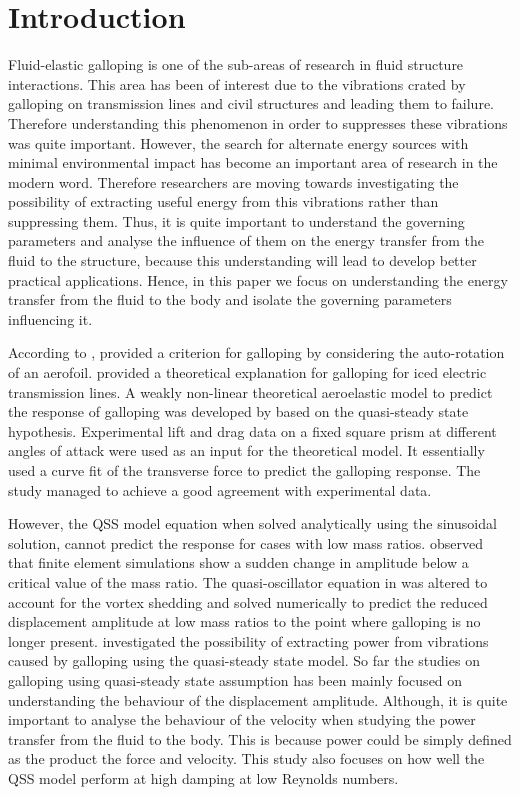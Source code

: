 \section{Introduction} 
 
Fluid-elastic galloping is one of the sub-areas of research in fluid structure interactions. This area has been of interest due to the vibrations crated by galloping on transmission lines and civil structures and leading them to failure. Therefore understanding this phenomenon in order to suppresses these vibrations was quite important. However, the search for alternate energy sources with minimal environmental impact has become an important area of research in the modern word. Therefore researchers are moving towards investigating the possibility of extracting useful energy from this vibrations rather than suppressing them. Thus, it is quite important to understand the governing parameters and analyse the influence of them on the energy transfer from the fluid to the structure, because this understanding will lead to develop better practical applications. Hence, in this paper we focus on understanding the energy transfer from the fluid to the body and isolate the governing parameters influencing it.

According to \citet{Paidoussis2010}, \citet{Glauert1919} provided a criterion for galloping by considering the auto-rotation of an aerofoil.  \citet{DenHartog1956} provided a theoretical explanation for galloping for iced electric transmission lines. A weakly non-linear theoretical aeroelastic model to predict the response of galloping was developed by \citet{Parkinson1964} based on the quasi-steady state hypothesis. Experimental lift and drag data on a fixed square prism at different angles of attack were used as an input for the theoretical model. It essentially used a curve fit of the transverse force to predict the galloping response. The study managed to achieve a good agreement with experimental data.

However, the QSS model equation when solved analytically using the sinusoidal solution, cannot predict the response for cases with low mass ratios. \citet{Joly2012} observed that finite element simulations show a sudden change in amplitude below a critical value of the mass ratio. The quasi-oscillator equation in \citet{Parkinson1964} was altered to account for the vortex shedding and solved numerically to predict the reduced displacement amplitude at low mass ratios to the point where galloping is no longer present. \citet{Barrero-Gil2010a} investigated the possibility of extracting power from vibrations caused by galloping using the quasi-steady state model. So far the studies on galloping using quasi-steady state assumption has been mainly focused on understanding the behaviour of the displacement amplitude. Although, it is quite important to analyse the behaviour of the velocity when studying the power transfer from the fluid to the body. This is because power could be simply defined as the product the force and velocity. This study also focuses on how well the QSS model perform at high damping at low Reynolds numbers. 


